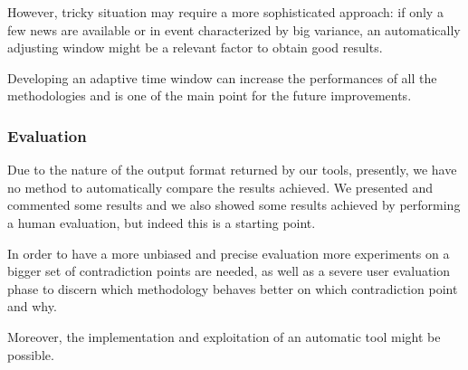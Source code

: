 However, tricky situation may require a more sophisticated approach: if only a
few news are available or in event characterized by big variance, an
automatically adjusting window might be a relevant factor to obtain good
results.

Developing an adaptive time window can increase the performances of all the methodologies and is one of the main point for the future improvements.

\subsubsection*{Evaluation}
Due to the nature of the output format returned by our tools, presently, we have
no method to automatically compare the results achieved. We presented and
commented some results and we also showed some results achieved by performing a
human evaluation, but indeed this is a starting point.

In order to have a more unbiased and precise evaluation more experiments on a
bigger set of contradiction points are needed, as well as a severe user
evaluation phase to discern which methodology behaves better on which
contradiction point and why.

Moreover, the implementation and exploitation of an automatic tool might be
possible.

